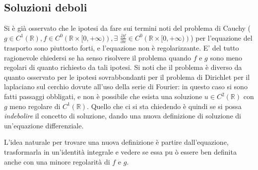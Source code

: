 \documentclass{article}
\begin{document}
\subsection{Soluzioni deboli}

Si \`{e} gi\`{a} osservato che le ipotesi da fare sui termini noti del
problema di Cauchy ($g\in C^{1}\left( 
\mathbb{R}
\right) ,f\in C^{0}\left( 
\mathbb{R}
\times \lbrack 0,+\infty )\right) ,\exists $ $\frac{\partial f}{\partial x}%
\in C^{0}\left( 
\mathbb{R}
\times \lbrack 0,+\infty )\right) $) per l'equazione del trasporto sono
piuttosto forti, e l'equazione non \`{e} regolarizzante. E' del tutto
ragionevole chiedersi se ha senso risolvere il problema quando $f$ e $g$
sono meno regolari di quanto richiesto da tali ipotesi. Si noti che il
problema \`{e} diverso da quanto osservato per le ipotesi sovrabbondanti per
il problema di Dirichlet per il laplaciano sul cerchio dovute all'uso della
serie di Fourier: in questo caso si sono fatti passaggi obbligati, e non 
\`{e} possibile che esista una soluzione $u\in C^{2}\left( 
\mathbb{R}
\right) $ con $g$ meno regolare di $C^{1}\left( 
\mathbb{R}
\right) $. Quello che ci si sta chiedendo \`{e} quindi se si possa \textit{%
indebolire} il concetto di soluzione, dando una nuova definizione di
soluzione di un'equazione differenziale.

L'idea naturale per trovare una nuova definizione \`{e} partire
dall'equazione, trasformarla in un'identit\`{a} integrale e vedere se essa pu%
\`{o} essere ben definita anche con una minore regolarit\`{a} di $f$ e $g$.
\end{document}
